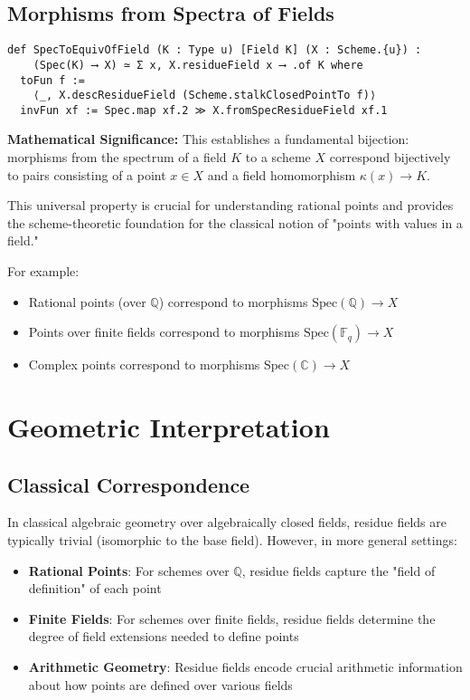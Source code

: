 \documentclass{article}
\theoremstyle{definition}
\begin{document}
\subsection{Morphisms from Spectra of Fields}

\begin{lstlisting}
def SpecToEquivOfField (K : Type u) [Field K] (X : Scheme.{u}) :
    (Spec(K) ⟶ X) ≃ Σ x, X.residueField x ⟶ .of K where
  toFun f :=
    ⟨_, X.descResidueField (Scheme.stalkClosedPointTo f)⟩
  invFun xf := Spec.map xf.2 ≫ X.fromSpecResidueField xf.1
\end{lstlisting}

\textbf{Mathematical Significance:} This establishes a fundamental bijection: morphisms from the spectrum of a field $K$ to a scheme $X$ correspond bijectively to pairs consisting of a point $x \in X$ and a field homomorphism $\kappa(x) \to K$.

This universal property is crucial for understanding rational points and provides the scheme-theoretic foundation for the classical notion of "points with values in a field."

For example:
\begin{itemize}
\item Rational points (over $\mathbb{Q}$) correspond to morphisms $\mathrm{Spec}(\mathbb{Q}) \to X$
\item Points over finite fields correspond to morphisms $\mathrm{Spec}(\mathbb{F}_q) \to X$
\item Complex points correspond to morphisms $\mathrm{Spec}(\mathbb{C}) \to X$
\end{itemize}

\section{Geometric Interpretation}

\subsection{Classical Correspondence}

In classical algebraic geometry over algebraically closed fields, residue fields are typically trivial (isomorphic to the base field). However, in more general settings:

\begin{itemize}
\item \textbf{Rational Points}: For schemes over $\mathbb{Q}$, residue fields capture the "field of definition" of each point
\item \textbf{Finite Fields}: For schemes over finite fields, residue fields determine the degree of field extensions needed to define points
\item \textbf{Arithmetic Geometry}: Residue fields encode crucial arithmetic information about how points are defined over various fields
\end{itemize}
\end{document}
